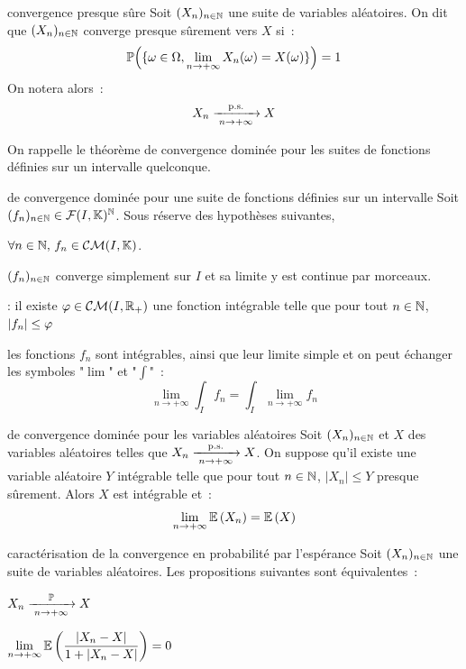\begin{definition}{}{convergence presque sûre}
    Soit $(X_n)_{n \in \mathbb{N}}$ une suite de variables aléatoires. On dit que $(X_n)_{n \in \mathbb{N}}$ converge presque sûrement vers $X$ si~:
    $$\mathbb{P}\Big(\{\omega \in \Omega, \lim_{n \to +\infty} X_n(\omega) = X(\omega)\}\Big) = 1$$
    On notera alors~:
        $$X_n \xrightarrow[\;n \to +\infty\;]{\mathrm{p.s.}} X$$
    
\end{definition}
\newpage
On rappelle le théorème de convergence dominée pour les suites de fonctions définies sur un intervalle quelconque.

\begin{theoreme}{}{de convergence dominée pour une suite de fonctions définies sur un intervalle}
    Soit $(f_n)_{n \in \mathbb{N}} \in \mathcal{F}(I,\mathbb{K})^{\mathbb{N}}$. Sous réserve des hypothèses suivantes,
    \begin{enumeratebf}
        \item $\forall n \in \mathbb{N},\, f_n \in \mathcal{CM}(I,\mathbb{K})$.
        \item $(f_n)_{n \in \mathbb{N}}$ converge simplement sur $I$ et sa limite y est continue par morceaux.
        \item {} : il existe $\varphi \in \mathcal{CM}(I, \mathbb{R}_+)$ une fonction intégrable telle que pour tout $n \in \mathbb{N}$, $|f_n| \leq \varphi$
    \end{enumeratebf}
    les fonctions $f_n$ sont intégrables, ainsi que leur limite simple et on peut échanger les symboles "$\lim$" et "$\int$"~:
    $$\lim_{n \to +\infty} \int_{I} f_n = \int_{I} \lim_{n \to +\infty} f_n $$
\end{theoreme}

\begin{theoreme}{}{de convergence dominée pour les variables aléatoires}
    Soit $(X_n)_{n \in \mathbb{N}}$ et $X$ des variables aléatoires telles que $X_n \xrightarrow[\;n \to +\infty\;]{\mathrm{p.s.}} X$. On suppose qu'il existe une variable aléatoire $Y$ intégrable telle que pour tout $n \in \mathbb{N}$, $\vert X_n \vert \leq Y$ presque sûrement. Alors $X$ est intégrable et~:
    $$\lim_{n \to +\infty} \mathbb{E}\left(X_n\right) = \mathbb{E}\left(X\right)$$
\end{theoreme}

\begin{proposition}{}{caractérisation de la convergence en probabilité par l'espérance}
    Soit $(X_n)_{n \in \mathbb{N}}$ une suite de variables aléatoires. Les propositions suivantes sont équivalentes~:
    \begin{enumeratebf}
        \item $X_n \xrightarrow[\;n \to +\infty\;]{\mathbb{P}} X$
        \item $ \displaystyle \lim_{n \to +\infty} \mathbb{E}\left(\frac{\vert X_n - X\vert}{1 + \vert X_n - X\vert}\right) = 0$
    \end{enumeratebf}
\end{proposition}

